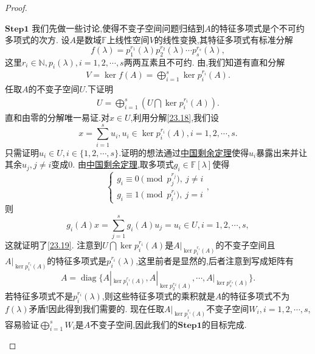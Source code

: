 \documentclass[../../main.tex]{subfiles}
\begin{document}
\begin{proof}
\begin{enumerate}[(1)]
$\mathbf{Step}\mathbf{1}$ 我们先做一些讨论,使得不变子空间问题归结到$A$的特征多项式是个不可约多项式的次方.
设$A$是数域$\mathbb{F}$上线性空间$V$的线性变换,其特征多项式有标准分解
$$f(\lambda)=p_1^{r_1}(\lambda)p_2^{r_2}(\lambda)\cdots p_s^{r_s}(\lambda),$$
这里$r_i\in\mathbb{N},p_i(\lambda),i=1,2,\cdots,s$两两互素且不可约.
由,我们知道有直和分解
\begin{align}
V=\ker f(A)=\bigoplus_{i=1}^s\ker p_i^{r_i}(A)\label{23.18}.
\end{align}
任取$A$的不变子空间$U$.下证明
\begin{align}
U=\bigoplus_{i=1}^s\left(U\bigcap\ker p_i^{r_i}(A)\right)\label{23.19}.
\end{align}
直和由零的分解唯一易证.对$x\in U$,利用分解\eqref{23.18},我们设
$$x=\sum_{i=1}^su_i,u_i\in\ker p_i^{r_i}(A),i=1,2,\cdots,s.$$
只需证明$u_i\in U,i\in\{1,2,\cdots,s\}$.证明的想法通过\hyperref[theorem:中国剩余定理(多项式版)]{中国剩余定理}使得$u_i$暴露出来并让其余$u_j,j\neq i$变成$0$.
由\hyperref[theorem:中国剩余定理(多项式版)]{中国剩余定理},取多项式$g_i\in\mathbb{F}[\lambda]$使得
$$\begin{cases}g_i\equiv0\pmod{p_j^{r_j}},\ j\neq i\\g_i\equiv1\pmod{p_i^{r_i}},\ j=i\end{cases},$$
则
$$g_i(A)x=\sum_{j=1}^sg_i(A)u_j=u_i\in U,i=1,2,\cdots,s,$$
这就证明了\eqref{23.19}.
注意到$U\bigcap\ker p_i^{r_i}(A)$是$A|_{\ker p_i^{r_i}(A)}$的不变子空间且$A|_{\ker p_i^{r_i}(A)}$的特征多项式是$p_i^{r_i}(\lambda)$,这里前者是显然的,后者注意到写成矩阵有
$$A=\operatorname{diag}\{A|_{\ker p_1^{r_1}(A)},A|_{\ker p_2^{r_2}(A)},\cdots,A|_{\ker p_s^{r_s}(A)}\}.$$
若特征多项式不是$p_i^{r_i}(\lambda)$,则这些特征多项式的乘积就是$A$的特征多项式不为$f(\lambda)$矛盾!因此得到我们需要的.
现在任取$A|_{\ker p_i^{r_i}(A)}$不变子空间$W_i,i=1,2,\cdots,s$,容易验证$\bigoplus_{i=1}^sW_i$是$A$不变子空间,因此我们的$\mathbf{Step}\mathbf{1}$的目标完成.


\end{enumerate}
\end{proof}
\end{document}
